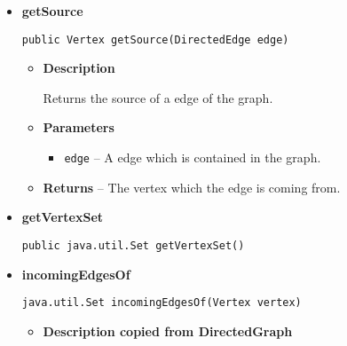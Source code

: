 {{{{{{{{{{{{{{{\begin{itemize}
{\begin{itemize}
{Returns a list of layouts which have been registered at the corresponding LayoutRegister for this graph type. The graph implementing this interface will be set as target of the LayoutOption.
}
\item{{\bf  Returns} -- 
A list of layouts which have been registered at the corresponding LayoutRegister for this graph type. 
}%
\end{itemize}
}%
\item{ 
{\bf  getSource}\\
\begin{lstlisting}[frame=none]
public Vertex getSource(DirectedEdge edge)\end{lstlisting} %
\begin{itemize}
\item{
{\bf  Description}

Returns the source of a edge of the graph.
}
\item{
{\bf  Parameters}
  \begin{itemize}
   \item{
\texttt{edge} -- A edge which is contained in the graph.}
  \end{itemize}
}%
\item{{\bf  Returns} -- 
The vertex which the edge is coming from. 
}%
\end{itemize}
}%
\item{ 
{\bf  getVertexSet}\\
\begin{lstlisting}[frame=none]
public java.util.Set getVertexSet()\end{lstlisting} %
}%
\item{ 
{\bf  incomingEdgesOf}\\
\begin{lstlisting}[frame=none]
java.util.Set incomingEdgesOf(Vertex vertex)\end{lstlisting} %
\begin{itemize}
\item{
{\bf  Description copied from DirectedGraph{\small {}} }

}
\end{itemize}}
\end{itemize}}}}}}}}}}}}}}}}
